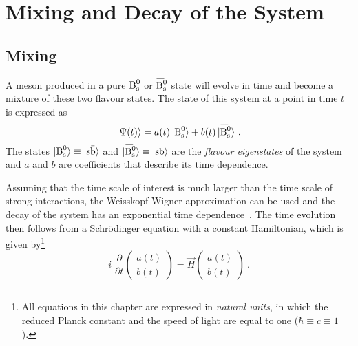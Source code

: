 \section{Mixing and Decay of the \BsBsbar{} System}

\subsection{Mixing}

A meson produced in a pure $\text{B}_\text{s}^0$ or $\Bsbar$ state will evolve in time and become a mixture of these two flavour states. The state of this
\BsBsbar{} system at a point in time $t$ is expressed as
\begin{equation}
  \label{eq:timeEvolBBbarState}
  |\Psi(t)\rangle = a(t)\,\Bsst + b(t)\,\Bsbarst
  \ .
\end{equation}
The states $|\text{B}_\text{s}^0\rangle\equiv|\text{s}\bar{\text{b}}\rangle$ and $\Bsbarst\equiv|\bar{\text{s}}\text{b}\rangle$ are the \emph{flavour
eigenstates} of the system and $a$ and $b$ are coefficients that describe its time dependence.

Assuming that the time scale of interest is much larger than the time scale of strong interactions, the Weisskopf-Wigner approximation can
be used and the decay of the system has an exponential time dependence~\cite{Weisskopf:1930au,*Weisskopf:1930ps,*Lee:1957qq}. The time
evolution then follows from a Schr\"odinger equation with a constant Hamiltonian, which is given by\footnote{All equations in this chapter
are expressed in \emph{natural units}, in which the reduced Planck constant and the speed of light are equal to one ($\hbar \equiv c \equiv
1$).}
\begin{equation}
  \label{eq:timeEvolSchr}
  i\; \frac{\partial}{\partial t} \begin{pmatrix} a(t) \\ b(t) \end{pmatrix}
    = \vec{H} \begin{pmatrix} a(t) \\ b(t) \end{pmatrix}
    \ .
\end{equation}

